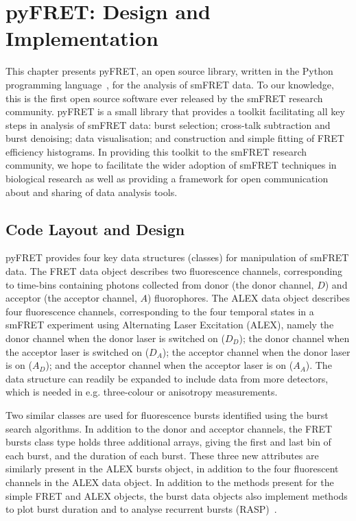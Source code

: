 \section{pyFRET: Design and Implementation}
This chapter presents pyFRET, an open source library, written in the Python programming language~\cite{vanRossum1995}, for the analysis of smFRET data. To our knowledge, this is the first open source software ever released by the smFRET research community. pyFRET is a small library that provides a toolkit facilitating all key steps in analysis of smFRET data: burst selection; cross-talk subtraction and burst denoising; data visualisation; and construction and simple fitting of FRET efficiency histograms. In providing this toolkit to the smFRET research community, we hope to facilitate the wider adoption of smFRET techniques in biological research as well as providing a framework for open communication about and sharing of data analysis tools.

\subsection{Code Layout and Design}
pyFRET provides four key data structures (classes) for manipulation of smFRET data. The FRET data object describes two fluorescence channels, corresponding to time-bins containing photons collected from donor (the donor channel, $D$) and acceptor (the acceptor channel, $A$) fluorophores. The ALEX data object describes four fluorescence channels, corresponding to the four temporal states in a smFRET experiment using Alternating Laser Excitation (ALEX), namely the donor channel when the donor laser is switched on ($D_D$); the donor channel when the acceptor laser is switched on ($D_A$); the acceptor channel when the donor laser is on ($A_D$); and the acceptor channel when the acceptor laser is on ($A_A$). The data structure can readily be expanded to include data from more detectors, which is needed in e.g. three-colour or anisotropy measurements.

Two similar classes are used for fluorescence bursts identified using the burst search algorithms. In addition to the donor and acceptor channels, the FRET bursts class type holds three additional arrays, giving the first and last bin of each burst, and the duration of each burst. These three new attributes are similarly present in the ALEX bursts object, in addition to the four fluorescent channels in the ALEX data object. In addition to the methods present for the simple FRET and ALEX objects, the burst data objects also implement methods to plot burst duration and to analyse recurrent bursts (RASP)~\cite{hoffmann11}. 

